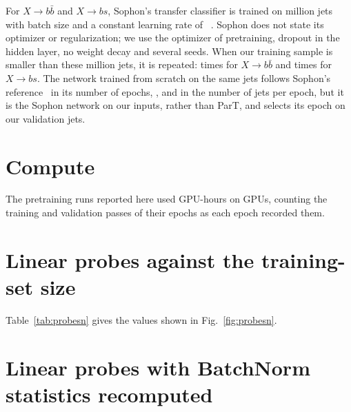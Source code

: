 \documentclass[11pt]{article}
\begin{document}
For $X\to b\bar b$ and $X\to bs$, Sophon's transfer classifier is trained on
\LitSophonTransferSamplesMillion{} million jets with batch size \LitSophonTransferBatch{} and a
constant learning rate of \LitSophonTransferLr~\cite[App.~B.5]{sophon}. Sophon does not state its
optimizer or regularization; we use the optimizer of pretraining, dropout in the hidden layer, no
weight decay and several seeds. When our training sample is smaller than these
\LitSophonTransferSamplesMillion{} million jets, it is repeated: \XbbRepetition{} times for
$X\to b\bar b$ and \XbsRepetition{} times for $X\to bs$. The network trained from scratch on the same jets follows Sophon's
reference~\cite[App.~B.3]{sophon} in its number of epochs, \LitSophonScratchEpochs, and in the
number of jets per epoch, but it is the Sophon network on our inputs, rather than ParT, and
selects its epoch on our validation jets.

\section{Compute}\label{app:compute}

The \ComputeRunsDone{} pretraining runs reported here used \ComputeTotalGpuHours{} GPU-hours on
\ComputeGpuTypes{} GPUs, counting the training and validation passes of their epochs as each epoch
recorded them.

\section{Linear probes against the training-set size}\label{app:probesn}

Table~\ref{tab:probesn} gives the values shown in Fig.~\ref{fig:probesn}.



\section{Linear probes with BatchNorm statistics recomputed}\label{app:bn}
\end{document}
